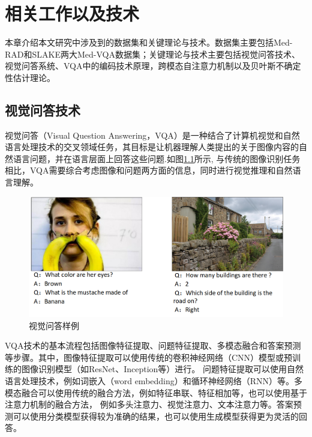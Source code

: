 \chapter{相关工作以及技术}
本章介绍本文研究中涉及到的数据集和关键理论与技术。数据集主要包括Med-RAD和SLAKE两大Med-VQA数据集；关键理论与技术主要包括视觉问答技术、视觉问答系统、VQA中的编码技术原理，跨模态自注意力机制以及贝叶斯不确定性估计理论。

\section{视觉问答技术}
视觉问答\cite{antol2015vqa}（Visual Question Answering，VQA）是一种结合了计算机视觉和自然语言处理技术的交叉领域任务，其目标是让机器理解人类提出的关于图像内容的自然语言问题，并在语言层面上回答这些问题.如图\ref{vqademo}所示\cite{shah2019kvqa},
与传统的图像识别任务相比，VQA需要综合考虑图像和问题两方面的信息，同时进行视觉推理和自然语言理解。
\begin{figure}[htbp]
	\centering	
	\includegraphics[width=1\textwidth]{Fig/myfig/chapter2/vqademo.png}  %
	\caption{\label{vqademo}视觉问答样例} 
\end{figure}

VQA技术的基本流程包括图像特征提取、问题特征提取、多模态融合和答案预测等步骤。其中，图像特征提取可以使用传统的卷积神经网络（CNN）模型或预训练的图像识别模型（如ResNet、Inception等）进行。
问题特征提取可以使用自然语言处理技术，例如词嵌入\cite{}（word embedding）和循环神经网络（RNN）等。多模态融合可以使用传统的融合方法，例如特征串联、特征相加等，也可以使用基于注意力机制的融合方法，
例如多头注意力、视觉注意力、文本注意力等。答案预测可以使用分类模型获得较为准确的结果，也可以使用生成模型获得更为灵活的回答。

